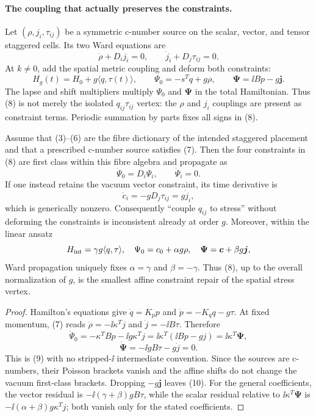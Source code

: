 \paragraph{The coupling that actually preserves the constraints.}

Let $(\rho,j_i,\tau_{ij})$ be a symmetric c-number source on the scalar,
vector, and tensor staggered cells.  Its two Ward equations are
\[
 \dot\rho+D_i j_i=0,\qquad
 \dot j_i+D_j\tau_{ij}=0.                          \tag{7}
\]
At $k\ne0$, add the spatial metric coupling and deform both constraints:
\[
 H_g(t)=H_0+g\langle q,\tau(t)\rangle,\qquad
 \Psi_0=-s^Tq+g\rho,\qquad
 \boldsymbol\Psi=\ii Bp-g\boldsymbol j.                          \tag{8}
\]
The lapse and shift multipliers multiply $\Psi_0$ and $\boldsymbol\Psi$ in the total
Hamiltonian.  Thus (8) is not merely the isolated $q_{ij}\tau_{ij}$ vertex:
the $\rho$ and $j_i$ couplings are present as constraint terms.  Periodic
summation by parts fixes all signs in (8).

\begin{theorem}
Assume that (3)--(6) are the fibre dictionary of the intended staggered
placement and that a prescribed c-number source satisfies (7).  Then the four
constraints in (8) are first class within this fibre algebra and propagate as
\[
 \dot\Psi_0=D_i\Psi_i,\qquad \dot\Psi_i=0.        \tag{9}
\]
If one instead retains the vacuum vector constraint, its time derivative is
\[
 \dot c_i=-gD_j\tau_{ij}=g\dot j_i,                \tag{10}
\]
which is generically nonzero.  Consequently ``couple $q_{ij}$ to stress''
without deforming the constraints is inconsistent already at order $g$.
Moreover, within the linear ansatz
\[
 H_{\rm int}=\gamma g\langle q,\tau\rangle,
 \quad\Psi_0=c_0+\alpha g\rho,
 \quad\boldsymbol\Psi=\boldsymbol c+\beta g\boldsymbol j,
\]
Ward propagation uniquely fixes $\alpha=\gamma$ and $\beta=-\gamma$.
Thus (8), up to the overall normalization of $g$, is the smallest affine
constraint repair of the spatial stress vertex.
\end{theorem}

\begin{proof}
Hamilton's equations give
$\dot q=K_pp$ and $\dot p=-K_qq-g\tau$.  At fixed momentum, (7) reads
$\dot\rho=-\ii\kappa^Tj$ and $\dot j=-\ii B\tau$.  Therefore
\[
 \dot\Psi_0=-\kappa^TBp-\ii g\kappa^Tj
             =\ii\kappa^T(\ii Bp-gj)=\ii\kappa^T\boldsymbol\Psi,
\]
\[
 \dot{\boldsymbol\Psi}=-\ii gB\tau-g\dot j=0.
\]
This is (9) with no stripped-$\ii$ intermediate convention.  Since the sources are c-numbers, their Poisson
brackets vanish and the affine shifts do not change the vacuum first-class
brackets.  Dropping $-g\boldsymbol j$ leaves (10).  For the general coefficients,
the vector residual is $-\ii(\gamma+\beta)gB\tau$, while the scalar residual
relative to $\ii\kappa^T\boldsymbol\Psi$ is
$-\ii(\alpha+\beta)g\kappa^Tj$; both vanish only for the stated coefficients.
\end{proof}


